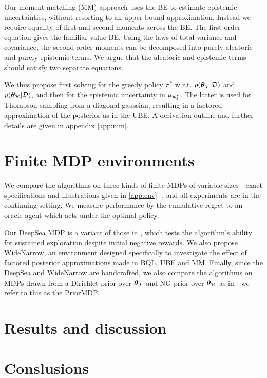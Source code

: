 \documentclass{article}
\begin{document}
Our moment matching (MM) approach uses the BE to estimate epistemic uncertainties, without resorting to an upper bound approximation. Instead we require equality of first and second moments across the BE. The first-order equation gives the familiar value-BE. Using the laws of total variance and covariance, the second-order moments can be decomposed into purely aleatoric and purely epistemic terms. We argue that the aleatoric and epistemic terms should satisfy two separate equations.

We thus propose first solving for the greedy policy $\pi^*$ w.r.t. $p(\boldsymbol{\theta}_{\mathcal{T}} | \mathcal{D})$ and $p(\boldsymbol{\theta}_{\mathcal{R}} | \mathcal{D})$, and then for the epistemic uncertainty in $\mu_{w^*_{\mathbf{s}}}$. The latter is used for Thompson sampling from a diagonal gaussian, resulting in a factored approximation of the posterior as in the UBE. A derivation outline and further details are given in appendix \ref{app:mm}.

\section{Finite MDP environments}

We compare the algorithms on three kinds of finite MDPs of variable sizes - exact specifications and illustrations given in \cref{app:env} -, and all experiments are in the continuing setting. We measure performance by the cumulative regret to an oracle agent which acts under the optimal policy.

Our DeepSea MDP is a variant of those in \cite{rand_val_func, deepsea}, which tests the algorithm's ability for sustained exploration despite initial negative rewards. We also propose WideNarrow, an environment designed specifically to investigate the effect of factored posterior approximations made in BQL, UBE and MM. Finally, since the DeepSea and WideNarrow are handcrafted, we also compare the algorithms on MDPs drawn from a Dirichlet prior over $\boldsymbol{\theta}_{\mathcal{T}}$ and NG prior over $\boldsymbol{\theta}_{\mathcal{R}}$ as in \cite{psrl} - we refer to this as the PriorMDP.

\section{Results and discussion}

\section{Conslusions}

\clearpage
\end{document}

